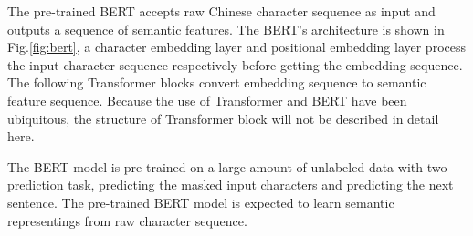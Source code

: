 \documentclass[a4paper]{article}
\begin{document}
The pre-trained BERT accepts raw Chinese character sequence as input and outputs a sequence of semantic features. The BERT's architecture is shown in Fig.\ref{fig:bert}, a character embedding layer and positional embedding layer process the input character sequence respectively before getting the embedding sequence. The following Transformer blocks convert embedding sequence to semantic feature sequence. Because the use of Transformer \cite{vaswani2017attention} and BERT have been ubiquitous, the structure of Transformer block will not be described in detail here.

The BERT model is pre-trained on a large amount of unlabeled data with two prediction task, predicting the masked input characters and predicting the next sentence. The pre-trained BERT model is expected to learn semantic representings from raw character sequence.
\end{document}
